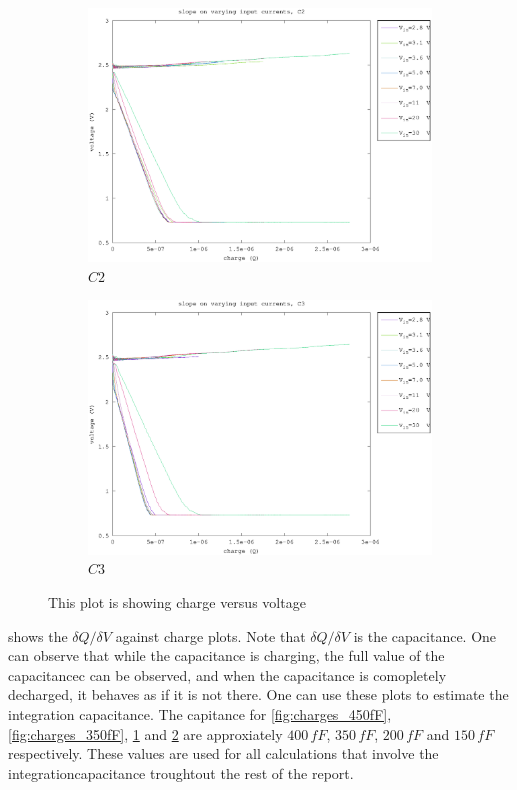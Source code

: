 \begin{figure}[h]
\begin{subfigure}[b]{0.475\textwidth}
    \centering 
    \includegraphics[width=\textwidth]{fig/charge_150fF.eps}
    \caption[]
        {$C2$}    
        \label{fig:charges_150fF}
\end{subfigure}
\quad
\begin{subfigure}[b]{0.475\textwidth}   
    \centering 
    \includegraphics[width=\textwidth]{fig/charge_50fF.eps}
    \caption[]
        {$C3$}    
        \label{fig:charges_50fF}
\end{subfigure}
\caption{This plot is showing charge versus voltage}
\label{fig:charges}
\end{figure}

 shows the $\delta Q/\delta V$ against charge plots. Note that $\delta Q/\delta V$ is the capacitance. One can observe that while the capacitance is charging, the full value of the capacitancec can be observed, and when the capacitance is comopletely decharged, it behaves as if it is not there. One can use these plots to estimate the integration capacitance. The capitance for \cref{fig:charges_450fF}, \ref{fig:charges_350fF}, \ref{fig:charges_150fF} and \ref{fig:charges_50fF} are approxiately $400\,fF$, $350\,fF$, $200\,fF$ and $150\,fF$ respectively. These values are used for all calculations that involve the integrationcapacitance troughtout the rest of the report.


